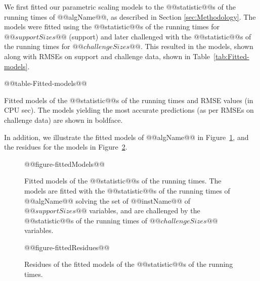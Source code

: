 We first fitted our parametric scaling models to the @@statistic@@s of the  running times
of @@algName@@, as described in Section \ref{sec:Methodology}. The
models were fitted using the @@statistic@@s of the  running times for $@@supportSizes@@$
(support) and later challenged with the @@statistic@@s of the  running times for $@@challengeSizes@@$.
This resulted in the models, shown along with RMSEs on support and
challenge data, shown in Table~\ref{tab:Fitted-models}.
\begin{table}[tb]
\begin{centering}
@@table-Fitted-models@@
% 
\par\end{centering}

\caption{\label{tab:Fitted-models}Fitted models of the @@statistic@@s of the  running times and RMSE
values (in CPU sec). The models yielding the most
accurate predictions (as per RMSEs on challenge data) are shown in
boldface.}
\end{table}
In addition, we illustrate the fitted models of @@algName@@ in Figure~\ref{fig:Fitted-models},
and the residues for the models in Figure~\ref{fig:Fitted-residues}.
\begin{figure}[tb]
\noindent \begin{centering}
@@figure-fittedModels@@
\par\end{centering}

\caption{\label{fig:Fitted-models} Fitted models of the @@statistic@@s of the  running times. 
The models are fitted with the @@statistic@@s of the  running times of
@@algName@@ solving the set of @@instName@@ 
of $@@supportSizes@@$ variables, and are challenged by the @@statistic@@s of the 
running times of $@@challengeSizes@@$ variables.}
\end{figure}


\begin{figure}[tb]
\noindent \begin{centering}
@@figure-fittedResidues@@
\par\end{centering}

\caption{\label{fig:Fitted-residues} Residues of the fitted models of the @@statistic@@s of the  running times. }
\end{figure}


